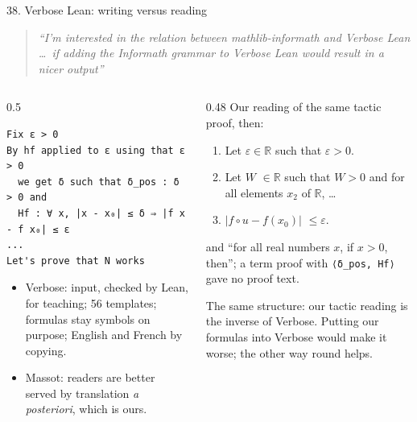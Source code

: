 \documentclass[10pt,aspectratio=169]{beamer}
\newcommand{\bad}[1]{\textcolor{warn}{#1}}
\newcommand{\prompt}[1]{\begin{quote}\small\itshape ``#1''\end{quote}}
\begin{document}
\begin{frame}[fragile]{38. Verbose Lean: writing versus reading}
  \scriptsize
  \prompt{I'm interested in the relation between mathlib-informath and Verbose Lean \ldots\ if
  adding the Informath grammar to Verbose Lean would result in a nicer output}
  \begin{columns}[T]
    \begin{column}{0.5\textwidth}
\begin{lstlisting}
Fix ε > 0
By hf applied to ε using that ε > 0
  we get δ such that δ_pos : δ > 0 and
  Hf : ∀ x, |x - x₀| ≤ δ ⇒ |f x - f x₀| ≤ ε
...
Let's prove that N works
\end{lstlisting}
      \begin{itemize}
        \item Verbose: input, checked by Lean, for teaching; 56 templates; formulas stay
              symbols on purpose; English and French by copying.
        \item Massot: readers are better served by translation \emph{a posteriori}, which is
              ours.
      \end{itemize}
    \end{column}
    \begin{column}{0.48\textwidth}
      Our reading of the same tactic proof, then:
      \begin{enumerate}\setlength{\itemsep}{0pt}
        \item Let $\varepsilon \in \mathbb{R}$ such that $\varepsilon > 0$.
        \item Let \bad{$W$} $\in \mathbb{R}$ such that $W > 0$ and for all elements $x_2$ of
              $\mathbb{R}$, \ldots
        \item[6.] \bad{$|f \circ u - f(x_0)|$} $\leq \varepsilon$.
      \end{enumerate}
      and \bad{``for all real numbers $x$, if $x > 0$, then''}; a term proof with
      \texttt{⟨δ\_pos, Hf⟩} gave \bad{no proof text}.

      \vspace{1mm}
      The same structure: our tactic reading is the inverse of Verbose. Putting our formulas into
      Verbose would make it worse; the other way round helps.
    \end{column}
  \end{columns}
\end{frame}
\end{document}
